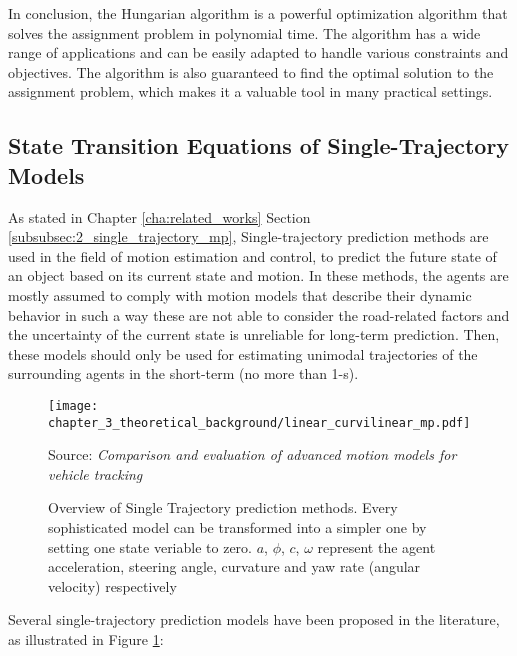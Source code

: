 In conclusion, the Hungarian algorithm is a powerful optimization algorithm that solves the assignment problem in polynomial time. The algorithm has a wide range of applications and can be easily adapted to handle various constraints and objectives. The algorithm is also guaranteed to find the optimal solution to the assignment problem, which makes it a valuable tool in many practical settings.
	
\subsection{State Transition Equations of Single-Trajectory Models}
\label{subsec:3_state_transitions_single_traj}

As stated in Chapter \ref{cha:related_works} Section \ref{subsubsec:2_single_trajectory_mp}, Single-trajectory prediction methods are used in the field of motion estimation and control, to predict the future state of an object based on its current state and motion. In these methods, the agents are mostly assumed to comply with motion models that describe their dynamic behavior in such a way these are not able to consider the road-related factors and the uncertainty of the current state is unreliable for long-term prediction. Then, these models should only be used for estimating unimodal trajectories of the surrounding agents in the short-term (no more than 1-s).

\begin{figure}[h]
	\centering
	\texttt{[image: chapter\_3\_theoretical\_background/linear\_curvilinear\_mp.pdf]}
	\caption[Overview of Single Trajectory prediction methods]{Overview of Single Trajectory prediction methods. Every sophisticated model can be transformed into a simpler one by setting one state veriable to zero. $a$, $\phi$, $c$, $\omega$ represent the agent acceleration, steering angle, curvature and yaw rate (angular velocity) respectively}
	Source: \textit{Comparison and evaluation of advanced motion models for vehicle tracking} \cite{schubert2008comparison}
	\label{fig:chapter_3_theoretical_background/linear_curvilinear_mp}
\end{figure}


Several single-trajectory prediction models have been proposed in the literature, as illustrated in Figure \ref{fig:chapter_3_theoretical_background/linear_curvilinear_mp}:

